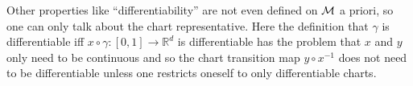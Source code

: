 Other properties like ``differentiability'' are not even defined on $\mathcal{M}$ a priori,
so one can only talk about the chart representative. Here the definition that $\gamma$
is differentiable iff $x\circ\gamma: [0,1]\to\mathbb{R}^{d}$ is differentiable has the
problem that $x$ and $y$ only need to be continuous and so the chart transition map
$y\circ x^{-1}$ does not need to be differentiable unless one restricts oneself to only
differentiable charts.

